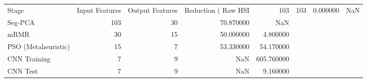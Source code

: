 \begin{tabular}{lrrrr}
\toprule
Stage & Input Features & Output Features & Reduction (%
\midrule
Raw HSI & 103 & 103 & 0.000000 & NaN \\
Seg-PCA & 103 & 30 & 70.870000 & NaN \\
mRMR & 30 & 15 & 50.000000 & 4.800000 \\
PSO (Metaheuristic) & 15 & 7 & 53.330000 & 54.170000 \\
CNN Training & 7 & 9 & NaN & 605.760000 \\
CNN Test & 7 & 9 & NaN & 9.160000 \\
\bottomrule
\end{tabular}
